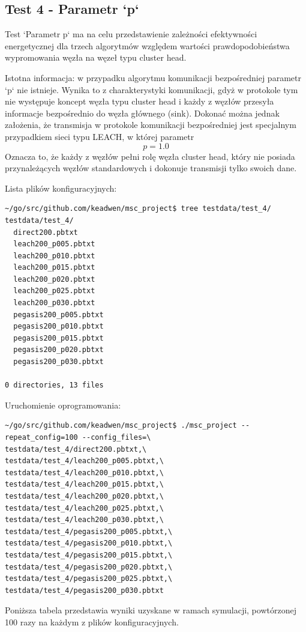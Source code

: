 \documentclass[a4paper,12pt,twoside,openany]{report}
\begin{document}
\subsection{Test 4 - Parametr `p`}

Test `Parametr p` ma na celu przedstawienie zależności efektywności energetycznej dla trzech algorytmów względem wartości prawdopodobieństwa wypromowania węzła na węzeł
typu cluster head. 

Istotna informacja: w przypadku algorytmu komunikacji bezpośredniej parametr `p` nie istnieje. Wynika to z charakterystyki komunikacji, gdyż w protokole
tym nie występuje koncept węzła typu cluster head i każdy z węzłów przesyła informacje bezpośrednio do węzła głównego (sink). Dokonać można jednak założenia, że 
transmisja w protokole komunikacji bezpośredniej jest specjalnym przypadkiem sieci typu LEACH, w której parametr \[ p = 1.0 \]
Oznacza to, że każdy z węzłów pełni rolę węzła cluster head, który nie posiada przynależących węzłów standardowych i dokonuje transmisji tylko swoich dane.

Lista plików konfiguracyjnych:

\begin{lstlisting}
~/go/src/github.com/keadwen/msc_project$ tree testdata/test_4/
testdata/test_4/
  direct200.pbtxt
  leach200_p005.pbtxt
  leach200_p010.pbtxt
  leach200_p015.pbtxt
  leach200_p020.pbtxt
  leach200_p025.pbtxt
  leach200_p030.pbtxt
  pegasis200_p005.pbtxt
  pegasis200_p010.pbtxt
  pegasis200_p015.pbtxt
  pegasis200_p020.pbtxt
  pegasis200_p030.pbtxt

0 directories, 13 files
\end{lstlisting}

Uruchomienie oprogramowania:

\begin{lstlisting}
~/go/src/github.com/keadwen/msc_project$ ./msc_project --repeat_config=100 --config_files=\
testdata/test_4/direct200.pbtxt,\
testdata/test_4/leach200_p005.pbtxt,\
testdata/test_4/leach200_p010.pbtxt,\
testdata/test_4/leach200_p015.pbtxt,\
testdata/test_4/leach200_p020.pbtxt,\
testdata/test_4/leach200_p025.pbtxt,\
testdata/test_4/leach200_p030.pbtxt,\
testdata/test_4/pegasis200_p005.pbtxt,\
testdata/test_4/pegasis200_p010.pbtxt,\
testdata/test_4/pegasis200_p015.pbtxt,\
testdata/test_4/pegasis200_p020.pbtxt,\
testdata/test_4/pegasis200_p025.pbtxt,\
testdata/test_4/pegasis200_p030.pbtxt
\end{lstlisting}

Poniższa tabela przedstawia wyniki uzyskane w ramach symulacji, powtórzonej 100 razy na każdym z plików konfiguracyjnych. 
\end{document}
